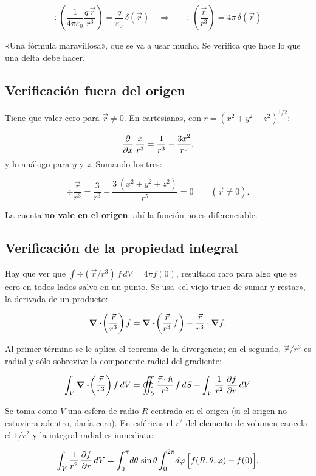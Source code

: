 \documentclass[12pt,a4paper]{article}
\begin{document}
\[
\div \left(\frac{1}{4\pi\varepsilon_0}\frac{q\,\vec r}{r^3}\right)
= \frac{q}{\varepsilon_0}\,\delta(\vec r)
\quad\Longrightarrow\quad
\boxed{\ \div \left(\frac{\vec r}{r^3}\right) = 4\pi\,\delta(\vec r)\ }
\]

«Una fórmula maravillosa», que se va a usar mucho. Se verifica que hace lo que
una delta debe hacer.

\subsection{Verificación fuera del origen}

Tiene que valer cero para $\vec r\neq0$. En cartesianas, con
$r = (x^2+y^2+z^2)^{1/2}$:

\[
\pdv{x}\,\frac{x}{r^3} = \frac{1}{r^3} - \frac{3x^2}{r^5},
\]
y lo análogo para $y$ y $z$. Sumando los tres:

\[
\div \frac{\vec r}{r^3} = \frac{3}{r^3} - \frac{3\,(x^2+y^2+z^2)}{r^5} = 0
\qquad (\vec r\neq0).
\]

\begin{warnbox}
La cuenta \textbf{no vale en el origen}: ahí la función no es diferenciable.
\end{warnbox}

\subsection{Verificación de la propiedad integral}

Hay que ver que $\int \div (\vec r/r^3)\,f\,dV = 4\pi f(0)$, resultado
raro para algo que es cero en todos lados salvo en un punto. Se usa «el viejo
truco de sumar y restar», la derivada de un producto:

\[
\div \!\left(\frac{\vec r}{r^3}\right) f
= \div \!\left(\frac{\vec r}{r^3}\,f\right) - \frac{\vec r}{r^3}\cdot\vnabla f .
\]

Al primer término se le aplica el teorema de la divergencia; en el segundo,
$\vec r/r^3$ es radial y sólo sobrevive la componente radial del gradiente:

\[
\int_V \div \!\left(\frac{\vec r}{r^3}\right) f\,dV
= \oiint_S \frac{\vec r\cdot\hat n}{r^3}\,f\,dS
- \int_V \frac{1}{r^2}\,\pdv{f}{r}\,dV .
\]

Se toma como $V$ una esfera de radio $R$ centrada en el origen (si el origen no
estuviera adentro, daría cero). En esféricas el $r^2$ del elemento de volumen
cancela el $1/r^2$ y la integral radial es inmediata:

\[
\int_V \frac{1}{r^2}\,\pdv{f}{r}\,dV
= \int_0^{\pi}\!d\theta\,\sin\theta\int_0^{2\pi}\!d\varphi\,
\Big[f(R,\theta,\varphi) - f(0)\Big].
\]
\end{document}
